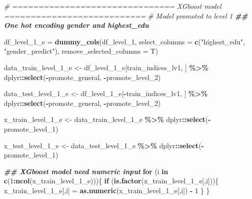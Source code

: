 \documentclass[11pt,]{article}
\newenvironment{Shaded}{\begin{snugshade}}{\end{snugshade}}
\newcommand{\AttributeTok}[1]{\textcolor[rgb]{0.13,0.29,0.53}{#1}}
\newcommand{\CommentTok}[1]{\textcolor[rgb]{0.56,0.35,0.01}{\textit{#1}}}
\newcommand{\ControlFlowTok}[1]{\textcolor[rgb]{0.13,0.29,0.53}{\textbf{#1}}}
\newcommand{\DecValTok}[1]{\textcolor[rgb]{0.00,0.00,0.81}{#1}}
\newcommand{\DocumentationTok}[1]{\textcolor[rgb]{0.56,0.35,0.01}{\textbf{\textit{#1}}}}
\newcommand{\FunctionTok}[1]{\textcolor[rgb]{0.13,0.29,0.53}{\textbf{#1}}}
\newcommand{\NormalTok}[1]{#1}
\newcommand{\OtherTok}[1]{\textcolor[rgb]{0.56,0.35,0.01}{#1}}
\newcommand{\SpecialCharTok}[1]{\textcolor[rgb]{0.81,0.36,0.00}{\textbf{#1}}}
\newcommand{\StringTok}[1]{\textcolor[rgb]{0.31,0.60,0.02}{#1}}
\begin{document}
\begin{Shaded}
\begin{Highlighting}[]
\CommentTok{\# =============================== XGboost model ===========================}
\CommentTok{\# Model promoted to level 1}
\DocumentationTok{\#\# One hot encoding gender and highest\_edu  }

\NormalTok{df\_level\_1\_e }\OtherTok{=} \FunctionTok{dummy\_cols}\NormalTok{(df\_level\_1, }\AttributeTok{select\_columns =} \FunctionTok{c}\NormalTok{(}\StringTok{"highest\_edu"}\NormalTok{, }\StringTok{"gender\_predict"}\NormalTok{),}
                          \AttributeTok{remove\_selected\_columns =}\NormalTok{ T) }


\NormalTok{data\_train\_level\_1\_e }\OtherTok{\textless{}{-}}\NormalTok{ df\_level\_1\_e[train\_indices\_lv1, ] }\SpecialCharTok{\%\textgreater{}\%} 
\NormalTok{  dplyr}\SpecialCharTok{::}\FunctionTok{select}\NormalTok{(}\SpecialCharTok{{-}}\NormalTok{promote\_general, }\SpecialCharTok{{-}}\NormalTok{promote\_level\_2)}

\NormalTok{data\_test\_level\_1\_e }\OtherTok{\textless{}{-}}\NormalTok{ df\_level\_1\_e[}\SpecialCharTok{{-}}\NormalTok{train\_indices\_lv1, ] }\SpecialCharTok{\%\textgreater{}\%} 
\NormalTok{  dplyr}\SpecialCharTok{::}\FunctionTok{select}\NormalTok{(}\SpecialCharTok{{-}}\NormalTok{promote\_general, }\SpecialCharTok{{-}}\NormalTok{promote\_level\_2)}
 

\NormalTok{x\_train\_level\_1\_e }\OtherTok{\textless{}{-}}\NormalTok{ data\_train\_level\_1\_e }\SpecialCharTok{\%\textgreater{}\%} 
\NormalTok{  dplyr}\SpecialCharTok{::}\FunctionTok{select}\NormalTok{(}\SpecialCharTok{{-}}\NormalTok{promote\_level\_1)}

\NormalTok{x\_test\_level\_1\_e }\OtherTok{\textless{}{-}}\NormalTok{ data\_test\_level\_1\_e }\SpecialCharTok{\%\textgreater{}\%} 
\NormalTok{  dplyr}\SpecialCharTok{::}\FunctionTok{select}\NormalTok{(}\SpecialCharTok{{-}}\NormalTok{promote\_level\_1)}

\DocumentationTok{\#\# XGboost model need numeric input}
\ControlFlowTok{for}\NormalTok{ (i }\ControlFlowTok{in} \FunctionTok{c}\NormalTok{(}\DecValTok{1}\SpecialCharTok{:}\FunctionTok{ncol}\NormalTok{(x\_train\_level\_1\_e)))\{}
  \ControlFlowTok{if}\NormalTok{ (}\FunctionTok{is.factor}\NormalTok{(x\_train\_level\_1\_e[,i]))\{}
\NormalTok{    x\_train\_level\_1\_e[,i] }\OtherTok{=} \FunctionTok{as.numeric}\NormalTok{(x\_train\_level\_1\_e[,i]) }\SpecialCharTok{{-}} \DecValTok{1}
\NormalTok{  \}}
\NormalTok{\}}


\end{Highlighting}
\end{Shaded}
\end{document}
